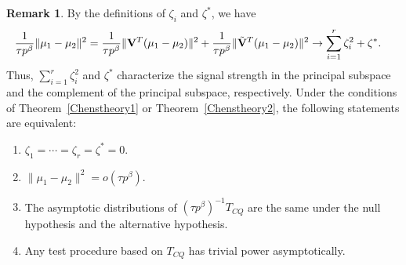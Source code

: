 \documentclass[review]{elsarticle}
\theoremstyle{plain}
\newtheorem{theorem}{\quad\quad Theorem}
\theoremstyle{definition}
\newtheorem{remark}{\quad\quad Remark}
\theoremstyle{remark}
\begin{document}
\begin{remark}\label{remark1}
    By the definitions of $\zeta_i$ and $\zeta^*$, we have
    $$
    \begin{aligned}
        &\frac{1}{\tau p^{\beta}}\|\mu_1-\mu_2\|^2
    =
    \frac{1}{\tau p^{\beta}}\|\mathbf{V}^T (\mu_1-\mu_2)\|^2
        +
        \frac{1}{\tau p^{\beta}}\|\tilde{\mathbf{V}}^T (\mu_1-\mu_2)\|^2
    \to \sum_{i=1}^r \zeta_i^2+ \zeta^*.
    \end{aligned}
    $$
    Thus, $\sum_{i=1}^r\zeta_i^2$ and $\zeta^*$ characterize the signal strength in the principal subspace and the complement of the principal subspace, respectively.
    Under the conditions of Theorem~\ref{Chenstheory1} or Theorem~\ref{Chenstheory2}, the following statements are equivalent:
    \begin{enumerate}[(1)]
        \item
     $\zeta_1=\cdots=\zeta_r=\zeta^*=0$.
 \item
     $\|\mu_1-\mu_2\|^2=o(\tau p^{\beta})$.
         \item
            The asymptotic distributions of $(\tau p^{\beta})^{-1}T_{CQ}$ are the same under the null hypothesis and the alternative hypothesis.
        \item
            Any test procedure based on $T_{CQ}$ has trivial power asymptotically.
    \end{enumerate}
\end{remark}
\end{document}
